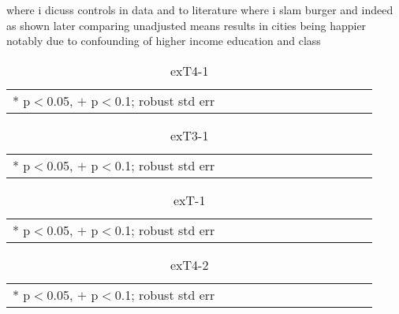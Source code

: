 \documentclass[10pt, letterpaper]{article}
\begin{document}
\begin{spacing}{1.4}
where i dicuss controls in data and to literature where i slam
  burger and indeed as shown later comparing unadjusted means results in cities
   being happier notably due to confounding of higher income education and class


\begin{spacing}{.9} \begin{table}[H]\centering \caption{.} \label{d1} \begin{scriptsize} \begin{tabular}{p{1.8in}p{.5in}p{.5in}p{.5in}p{.5in}p{.5in}p{.5in}p{.5in}p{.5in}p{.5in}p{.5 in}p{.5in}p{.5 in}}\hline  \hline   * p$<$0.05, $+$ p$<$0.1; robust std err \end{tabular}\end{scriptsize}\caption{exT4-1}\end{table} \end{spacing}

\begin{spacing}{.9} \begin{table}[H]\centering \caption{.} \label{d1} \begin{scriptsize} \begin{tabular}{p{1.8in}p{.5in}p{.5in}p{.5in}p{.5in}p{.5in}p{.5in}p{.5in}p{.5in}p{.5in}p{.5 in}p{.5in}p{.5 in}}\hline  \hline   * p$<$0.05, $+$ p$<$0.1; robust std err \end{tabular}\end{scriptsize}\caption{exT3-1}\end{table} \end{spacing}

\begin{spacing}{.9} \begin{table}[H]\centering \caption{.} \label{d1} \begin{scriptsize} \begin{tabular}{p{1.8in}p{.5in}p{.5in}p{.5in}p{.5in}p{.5in}p{.5in}p{.5in}p{.5in}p{.5in}p{.5 in}p{.5in}p{.5 in}}\hline  \hline   * p$<$0.05, $+$ p$<$0.1; robust std err \end{tabular}\end{scriptsize}\caption{exT-1}\end{table} \end{spacing}


\begin{spacing}{.9} \begin{table}[H]\centering \caption{.} \label{d1} \begin{scriptsize} \begin{tabular}{p{1.8in}p{.5in}p{.5in}p{.5in}p{.5in}p{.5in}p{.5in}p{.5in}p{.5in}p{.5in}p{.5 in}p{.5in}p{.5 in}}\hline  \hline   * p$<$0.05, $+$ p$<$0.1; robust std err \end{tabular}\end{scriptsize}\caption{exT4-2}\end{table} \end{spacing}


\end{spacing}
\end{document}
